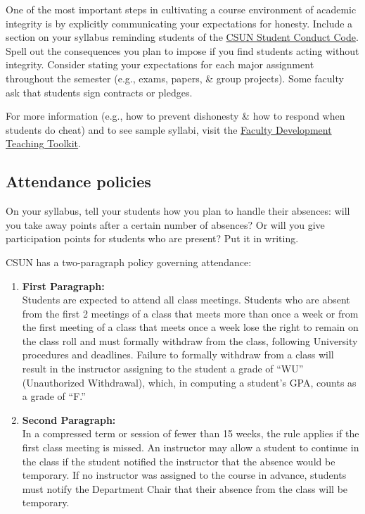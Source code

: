 \documentclass[
  letterpaper,
  DIV=11,
  numbers=noendperiod]{scrartcl}
\begin{document}
One of the most important steps in cultivating a course environment of
academic integrity is by explicitly communicating your expectations for
honesty. Include a section on your syllabus reminding students of the
\href{https://www.csun.edu/}{CSUN Student Conduct Code}. Spell out the
consequences you plan to impose if you find students acting without
integrity. Consider stating your expectations for each major assignment
throughout the semester (e.g., exams, papers, \& group projects). Some
faculty ask that students sign contracts or pledges.

For more information (e.g., how to prevent dishonesty \& how to respond
when students do cheat) and to see sample syllabi, visit the
\href{https://www.csun.edu/}{Faculty Development Teaching Toolkit}.

\subsection{Attendance policies}\label{attendance-policies}

On your syllabus, tell your students how you plan to handle their
absences: will you take away points after a certain number of absences?
Or will you give participation points for students who are present? Put
it in writing.

CSUN has a two-paragraph policy governing attendance:

\begin{enumerate}
\def\labelenumi{\arabic{enumi}.}
\item
  \textbf{First Paragraph:}\\
  Students are expected to attend all class meetings. Students who are
  absent from the first 2 meetings of a class that meets more than once
  a week or from the first meeting of a class that meets once a week
  lose the right to remain on the class roll and must formally withdraw
  from the class, following University procedures and deadlines. Failure
  to formally withdraw from a class will result in the instructor
  assigning to the student a grade of ``WU'' (Unauthorized Withdrawal),
  which, in computing a student's GPA, counts as a grade of ``F.''
\item
  \textbf{Second Paragraph:}\\
  In a compressed term or session of fewer than 15 weeks, the rule
  applies if the first class meeting is missed. An instructor may allow
  a student to continue in the class if the student notified the
  instructor that the absence would be temporary. If no instructor was
  assigned to the course in advance, students must notify the Department
  Chair that their absence from the class will be temporary.
\end{enumerate}
\end{document}
